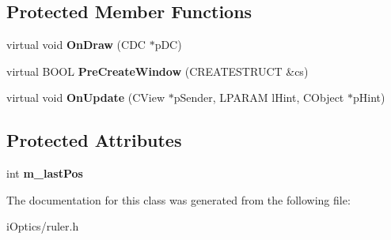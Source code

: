 \subsection*{Protected Member Functions}
\begin{DoxyCompactItemize}
\item 
\mbox{\label{class_c_ruler_view_a69be569b6ac91a18a4f70110b88ec4fe}} 
virtual void {\bfseries On\+Draw} (C\+DC $\ast$p\+DC)
\item 
\mbox{\label{class_c_ruler_view_ae7699c2bc9045142feb92e885c8ca314}} 
virtual B\+O\+OL {\bfseries Pre\+Create\+Window} (C\+R\+E\+A\+T\+E\+S\+T\+R\+U\+CT \&cs)
\item 
\mbox{\label{class_c_ruler_view_a00f7c68e8e360ba6a9330af65c0ca4cf}} 
virtual void {\bfseries On\+Update} (C\+View $\ast$p\+Sender, L\+P\+A\+R\+AM l\+Hint, C\+Object $\ast$p\+Hint)
\end{DoxyCompactItemize}
\subsection*{Protected Attributes}
\begin{DoxyCompactItemize}
\item 
\mbox{\label{class_c_ruler_view_a9a6e088945b06267a191c9d8dd7f6916}} 
int {\bfseries m\+\_\+last\+Pos}
\end{DoxyCompactItemize}


The documentation for this class was generated from the following file\+:\begin{DoxyCompactItemize}
\item 
i\+Optics/ruler.\+h\end{DoxyCompactItemize}
